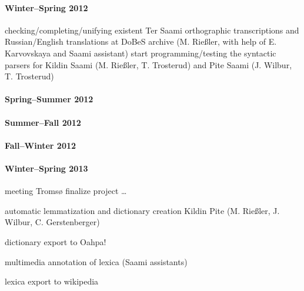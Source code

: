 \documentclass[a4paper,12pt]{article}
\begin{document}
{{{{\paragraph{Winter–Spring 2012}
checking/completing/unifying existent Ter Saami orthographic transcriptions and Russian/English translations at DoBeS archive 
(M. Rießler, with help of E. Karvovskaya and Saami assistant)
start programming/testing the syntactic parsers for Kildin Saami (M. Rießler, T. Trosterud) and Pite Saami (J. Wilbur, T. Trosterud)

\paragraph{Spring–Summer 2012}

\paragraph{Summer–Fall 2012}

\paragraph{Fall–Winter 2012}

\paragraph{Winter–Spring 2013}
meeting Tromsø
finalize project
…

automatic lemmatization and dictionary creation Kildin Pite (M. Rießler, J. Wilbur, C. Gerstenberger)

dictionary export to Oahpa!

multimedia annotation of lexica (Saami assistants)

lexica export to wikipedia

}}}}
\end{document}
